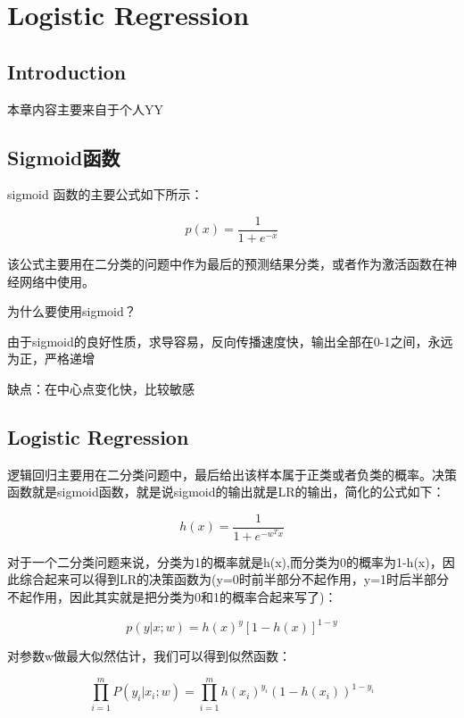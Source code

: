 \chapter{Logistic Regression}

\section*{Introduction}
	本章内容主要来自于个人YY

\section{Sigmoid函数}
	\boldmath  %
	sigmoid 函数的主要公式如下所示：
	
	\begin{equation}
		p(x) = \frac{1}{1+e^{-x}}
	\end{equation}		
	
	该公式主要用在二分类的问题中作为最后的预测结果分类，或者作为激活函数在神经网络中使用。
	
	为什么要使用sigmoid？
	
	由于sigmoid的良好性质，求导容易，反向传播速度快，输出全部在0-1之间，永远为正，严格递增
	
	缺点：在中心点变化快，比较敏感
	

\section{Logistic Regression}
	\boldmath  %
	逻辑回归主要用在二分类问题中，最后给出该样本属于正类或者负类的概率。决策函数就是sigmoid函数，就是说sigmoid的输出就是LR的输出，简化的公式如下：
	
	\begin{equation}
		h(x) = \frac{1}{1+e^{-w^T x}}
	\end{equation}
	
	对于一个二分类问题来说，分类为1的概率就是h(x),而分类为0的概率为1-h(x)，因此综合起来可以得到LR的决策函数为(y=0时前半部分不起作用，y=1时后半部分不起作用，因此其实就是把分类为0和1的概率合起来写了)：
	
	\begin{equation}
		p(y|x;w) = h(x)^y [1-h(x)]^{1-y}
	\end{equation}
	
	对参数w做最大似然估计，我们可以得到似然函数：
	
	\begin{equation}
		\prod_{i=1}^m P(y_i|x_i;w) = \prod_{i=1}^m h(x_i)^{y_i}(1-h(x_i))^{1-y_i}
	\end{equation}
	
